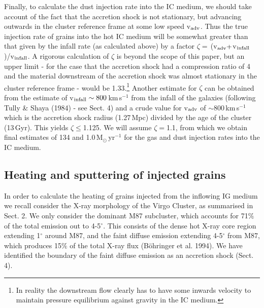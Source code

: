 \documentclass[]{aa}
\begin{document}
Finally, to calculate the dust injection rate into the
IC medium, we should take account of the fact that the accretion shock is
not stationary, but advancing outwards in the cluster reference frame
at some low speed v$_{\rm adv}$. Thus the true injection rate of grains into 
the hot IC medium will be somewhat greater than that given by the infall rate 
(as calculated above) by a factor 
$\zeta=$\,(v$_{\rm adv}+$v$_{\rm infall}$)/v$_{\rm infall}$. A rigorous
calculation of $\zeta$ is beyond the scope of this paper, but an
upper limit - for the case that the accretion shock had a compression ratio of
4 and the material downstream of the accretion shock was 
almost stationary in the cluster reference frame - would be 1.33.\footnote{In 
reality the downstream flow clearly has to have some inwards velocity to
maintain pressure equilibrium against gravity in the IC medium.} Another
estimate for $\zeta$ can be obtained from the estimate of
v$_{\rm infall}\sim800$\,km$\,$s$^{-1}$ from the infall of the galaxies
(following Tully \& Shaya (1984) - see Sect. 4) and a crude value for 
v$_{\rm adv}$ of $\sim800$\,km$\,$s$^{-1}$ which is the accretion shock 
radius (1.27\,Mpc) divided by the age of the cluster (13\,Gyr). 
This yields $\zeta\leq$1.125. We will assume $\zeta=$1.1, from which
we obtain final estimates of 134 and 1.0\,M$_{\odot}\,$yr$^{-1}$ for the
gas and dust injection rates into the IC medium.


\subsection{Heating and sputtering of injected grains}

In order to calculate the heating of grains injected from the
inflowing IG medium we recall consider the X-ray
morphology of the Virgo Cluster, as summarised in Sect. 2.
We only consider the dominant M87 subcluster, which accounts for
71$\%$ of the total emission out to 4-5$^{\circ}$.
This consists of the dense hot X-ray core region 
extending 1$^{\circ}$ around M87, and 
the faint diffuse emission extending 4-5$^{\circ}$ from M87, which
produces 15$\%$ of the total X-ray flux (B\"ohringer et al. 1994). We have
identified the boundary of the faint diffuse emission as an accretion shock 
(Sect. 4).
\end{document}
